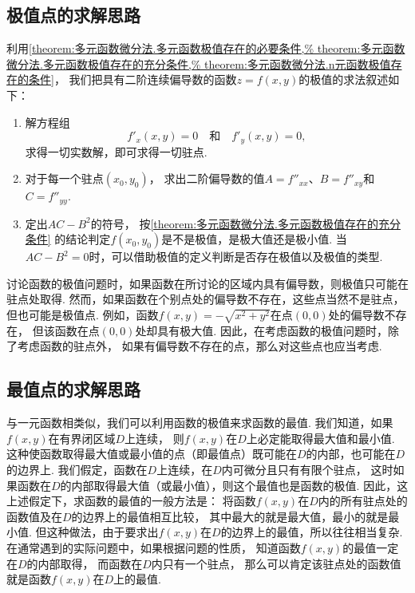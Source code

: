 \subsection{极值点的求解思路}
利用\cref{theorem:多元函数微分法.多元函数极值存在的必要条件,%
theorem:多元函数微分法.多元函数极值存在的充分条件,%
theorem:多元函数微分法.n元函数极值存在的条件}，
我们把具有二阶连续偏导数的函数\(z = f(x,y)\)的极值的求法叙述如下：
\begin{enumerate}
	\item 解方程组\[
		f'_x(x,y) = 0
		\quad\text{和}\quad
		f'_y(x,y) = 0,
	\]求得一切实数解，即可求得一切驻点.

	\item 对于每一个驻点\((x_0,y_0)\)，
	求出二阶偏导数的值\(A=f''_{xx}\)、\(B=f''_{xy}\)和\(C=f''_{yy}\).

	\item 定出\(AC-B^2\)的符号，
	按\cref{theorem:多元函数微分法.多元函数极值存在的充分条件}
	的结论判定\(f(x_0,y_0)\)是不是极值，是极大值还是极小值.
	当\(AC-B^2=0\)时，可以借助极值的定义判断是否存在极值以及极值的类型.
\end{enumerate}

讨论函数的极值问题时，如果函数在所讨论的区域内具有偏导数，则极值只可能在驻点处取得.
然而，如果函数在个别点处的偏导数不存在，这些点当然不是驻点，但也可能是极值点.
例如，函数\(f(x,y) = -\sqrt{x^2+y^2}\)在点\((0,0)\)处的偏导数不存在，
但该函数在点\((0,0)\)处却具有极大值.
因此，在考虑函数的极值问题时，除了考虑函数的驻点外，
如果有偏导数不存在的点，那么对这些点也应当考虑.

\subsection{最值点的求解思路}
与一元函数相类似，我们可以利用函数的极值来求函数的最值.
我们知道，如果\(f(x,y)\)在有界闭区域\(D\)上连续，
则\(f(x,y)\)在\(D\)上必定能取得最大值和最小值.
这种使函数取得最大值或最小值的点（即最值点）既可能在\(D\)的内部，也可能在\(D\)的边界上.
我们假定，函数在\(D\)上连续，在\(D\)内可微分且只有有限个驻点，
这时如果函数在\(D\)的内部取得最大值（或最小值），则这个最值也是函数的极值.
因此，这上述假定下，求函数的最值的一般方法是：
将函数\(f(x,y)\)在\(D\)内的所有驻点处的函数值及在\(D\)的边界上的最值相互比较，
其中最大的就是最大值，最小的就是最小值.
但这种做法，由于要求出\(f(x,y)\)在\(D\)的边界上的最值，所以往往相当复杂.
在通常遇到的实际问题中，如果根据问题的性质，
知道函数\(f(x,y)\)的最值一定在\(D\)的内部取得，
而函数在\(D\)内只有一个驻点，
那么可以肯定该驻点处的函数值就是函数\(f(x,y)\)在\(D\)上的最值.

